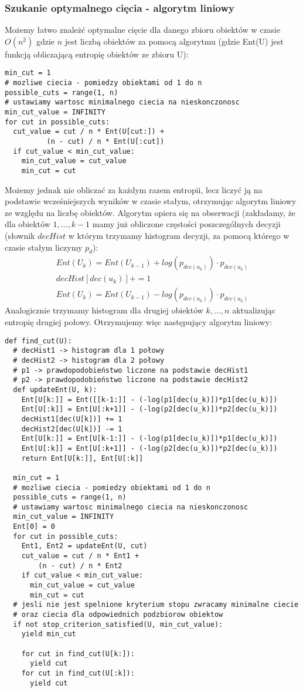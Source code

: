 \documentclass[magisterska]{pracamgr}
\theoremstyle{plain}
\theoremstyle{definition}
\theoremstyle{remark}
\begin{document}
\subsubsection{Szukanie optymalnego cięcia - algorytm liniowy}
Możemy łatwo znależć optymalne cięcie dla danego zbioru obiektów w czasie $O(n^2)$ gdzie $n$ jest
liczbą obiektów za pomocą algorytmu (gdzie Ent(U) jest funkcją obliczającą entropię obiektów ze zbioru U):
\begin{lstlisting}
min_cut = 1
# mozliwe ciecia - pomiedzy obiektami od 1 do n
possible_cuts = range(1, n)
# ustawiamy wartosc minimalnego ciecia na nieskonczonosc
min_cut_value = INFINITY
for cut in possible_cuts:
  cut_value = cut / n * Ent(U[cut:]) + 
	      (n - cut) / n * Ent(U[:cut])
  if cut_value < min_cut_value:
    min_cut_value = cut_value
    min_cut = cut	      
\end{lstlisting}
Możemy jednak nie obliczać za każdym razem entropii, lecz liczyć ją na podstawie 
wcześniejszych wyników w czasie stałym, otrzymując algorytm liniowy ze względu na liczbę 
obiektów. Algorytm opiera się na obserwacji (zakładamy, że dla obiektów $1, ..., k-1$ mamy już obliczone 
częstości poszczególnych decyzji (słownik $decHist$ w którym trzymamy histogram decyzji, za pomocą którego w czasie stałym
liczymy $p_d$):
\begin{align*}
  Ent(U_k) = Ent(U_{k-1}) + log(p_{dec(u_k)}) \cdot p_{dec(u_k)} \\
  decHist[dec(u_k)] += 1 \\
  Ent(U_k) = Ent(U_{k-1}) - log(p_{dec(u_k)}) \cdot p_{dec(u_k)}
\end{align*}
Analogicznie trzymamy histogram dla drugiej obiektów $k, ..., n$ aktualizując entropię drugiej połowy.
Otrzymujemy więc następujący algorytm liniowy:
\begin{lstlisting}
def find_cut(U):
  # decHist1 -> histogram dla 1 połowy
  # decHist2 -> histogram dla 2 połowy
  # p1 -> prawdopodobieństwo liczone na podstawie decHist1
  # p2 -> prawdopodobieństwo liczone na podstawie decHist2
  def updateEnt(U, k):
    Ent[U[k:]] = Ent([[k-1:]] - (-log(p1[dec(u_k)])*p1[dec(u_k)])
    Ent[U[:k]] = Ent[U[:k+1]] - (-log(p2[dec(u_k)])*p2[dec(u_k)])
    decHist1[dec(U[k])] += 1    
    decHist2[dec(U[k])] -= 1
    Ent[U[k:]] = Ent[U[k-1:]] - (-log(p1[dec(u_k)])*p1[dec(u_k)])
    Ent[U[:k]] = Ent[U[:k+1]] - (-log(p2[dec(u_k)])*p2[dec(u_k)])
    return Ent[U[k:]], Ent[U[:k]]
    
  min_cut = 1
  # mozliwe ciecia - pomiedzy obiektami od 1 do n
  possible_cuts = range(1, n)
  # ustawiamy wartosc minimalnego ciecia na nieskonczonosc
  min_cut_value = INFINITY
  Ent[0] = 0
  for cut in possible_cuts:
    Ent1, Ent2 = updateEnt(U, cut)
    cut_value = cut / n * Ent1 + 
		(n - cut) / n * Ent2
    if cut_value < min_cut_value:
      min_cut_value = cut_value
      min_cut = cut	
  # jesli nie jest spelnione kryterium stopu zwracamy minimalne ciecie
  # oraz ciecia dla odpowiednich podzbiorow obiektow
  if not stop_criterion_satisfied(U, min_cut_value):
    yield min_cut
    
    for cut in find_cut(U[k:]):
      yield cut 
    for cut in find_cut(U[:k]):
      yield cut
\end{lstlisting}
\end{document}
